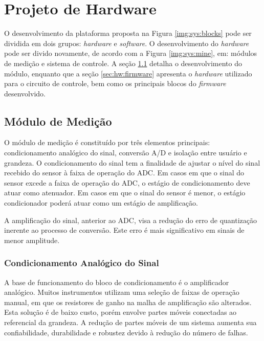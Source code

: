 \chapter{Projeto de Hardware}\label{cap:hw}

	O desenvolvimento da plataforma proposta na Figura \ref{img:sys:blocks} pode ser dividida em dois grupos: \textit{hardware} e \textit{software}. O desenvolvimento do \textit{hardware} pode ser divido novamente, de acordo com a Figura \ref{img:sys:mine}, em: módulos de medição e sistema de controle. A seção \ref{sec:hw:sch} detalha o desenvolvimento do módulo, enquanto que a seção \ref{sec:hw:firmware} apresenta o \textit{hardware} utilizado para o circuito de controle, bem como os principais blocos do \textit{firmware} desenvolvido.


	\section{Módulo de Medição}\label{sec:hw:sch}

		O módulo de medição é constituído por três elementos principais: condicionamento analógico do sinal, conversão A/D e isolação entre usuário e grandeza. O condicionamento do sinal tem a finalidade de ajustar o nível do sinal recebido do sensor à faixa de operação do ADC. Em casos em que o sinal do sensor excede a faixa de operação do ADC, o estágio de condicionamento deve atuar como atenuador. Em casos em que o sinal do sensor é menor, o estágio condicionador poderá atuar como um estágio de amplificação.

		A amplificação do sinal, anterior ao ADC, visa a redução do erro de quantização inerente ao processo de conversão. Este erro é mais significativo em sinais de menor amplitude.

			\subsection{Condicionamento Analógico do Sinal}\label{sec:hw:sch:analog}

				A base de funcionamento do bloco de condicionamento é o amplificador analógico. Muitos instrumentos utilizam uma seleção de faixas de operação manual, em que os resistores de ganho na malha de amplificação são alterados. Esta solução é de baixo custo, porém envolve partes móveis conectadas ao referencial da grandeza. A redução de partes móveis de um sistema aumenta sua confiabilidade, durabilidade e robustez devido à redução do número de falhas.


